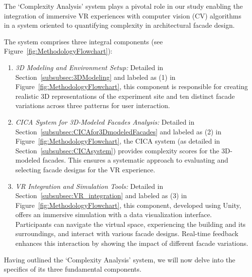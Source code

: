 The `Complexity Analysis' system plays a pivotal role in our study enabling the integration of immersive VR experiences with computer vision (CV) algorithms in a system oriented to quantifying complexity in architectural facade design.

The system comprises three integral components (see Figure~\ref{fig:MethodologyFlowchart}):

\begin{enumerate}
\item \textit{3D Modeling and Environment Setup:} Detailed in Section~\ref{subsubsec:3DModeling} and labeled as (1) in Figure~\ref{fig:MethodologyFlowchart}, this component is responsible for creating realistic 3D representations of the experiment site and ten distinct facade variations across three patterns for user interaction.

\item \textit{CICA System for 3D-Modeled Facades Analysis:} Detailed in Section~\ref{subsubsec:CICAfor3DmodeledFacades} and labeled as (2) in Figure~\ref{fig:MethodologyFlowchart}, the CICA system (as detailed in Section~\ref{subsubsec:CICAsystem}) provides complexity scores for the 3D-modeled facades.
This ensures a systematic approach to evaluating and selecting facade designs for the VR experience.

\item \textit{VR Integration and Simulation Tools:} Detailed in Section~\ref{subsubsec:VR_integration} and labeled as (3) in Figure~\ref{fig:MethodologyFlowchart}, this component, developed using Unity, offers an immersive simulation with a data visualization interface.
Participants can navigate the virtual space, experiencing the building and its surroundings, and interact with various facade designs.
Real-time feedback enhances this interaction by showing the impact of different facade variations.
\end{enumerate}

Having outlined the `Complexity Analysis' system, we will now delve into the specifics of its three fundamental components.


